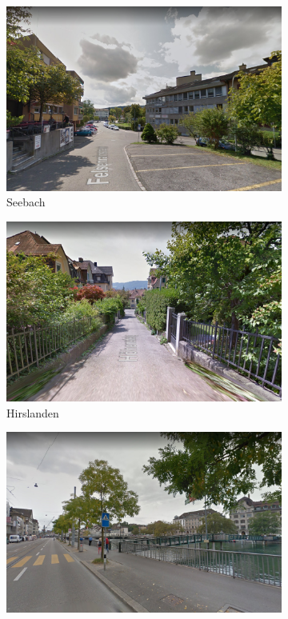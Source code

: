 \documentclass[letterpaper]{article}
\begin{document}
\begin{figure}[H]
\begin{subfigure}[t]{.45\columnwidth}
        \includegraphics[width=\linewidth]{images/good/seebach.png}
        \caption[width=.9\linewidth]{Seebach}
    \end{subfigure}\hspace{0.05\columnwidth}
    \begin{subfigure}[t]{.45\columnwidth}
        \centering
        \includegraphics[width=\linewidth]{images/good/hirslanden.png}
        \caption[width=.9\linewidth]{Hirslanden}
    \end{subfigure}\vspace{1mm}
    \begin{subfigure}[t]{.45\columnwidth}
        \centering
        \includegraphics[width=\linewidth]{images/good/central.png}

\end{subfigure}
\end{figure}
\end{document}
